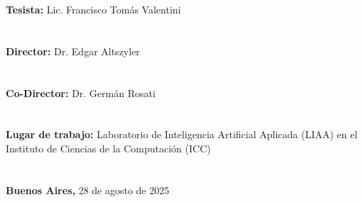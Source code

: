 \begin{titlepage}
    \begin{minipage}[t]{0.9\textwidth}
        {\normalsize{\textbf{Tesista: }}{\normalsize{Lic. Francisco Tomás Valentini}}}\\ \\
        \vspace{-8mm}   \\
        {\normalsize{\textbf{Director: }}{\normalsize{Dr. Edgar Altszyler}}}\\ \\
        \vspace{-8mm}   \\
        {\normalsize{\textbf{Co-Director: }}{\normalsize{Dr. Germán Rosati}}}\\ \\
        \vspace{-8mm}   \\
        {\normalsize{\textbf{Lugar de trabajo: }}{\normalsize{Laboratorio de Inteligencia Artificial Aplicada (LIAA) en el Instituto de Ciencias de la Computación (ICC)}}}\\ \\
        \vspace{-8mm}   \\
        {\normalsize{\textbf{Buenos Aires, }}{\normalsize{28 de agosto de 2025}}}
    \end{minipage}


\end{titlepage}
